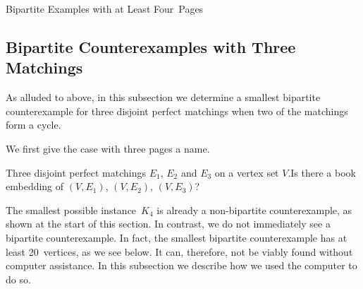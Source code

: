 \begin{subsection}{Bipartite Examples with at Least Four~Pages}
\begin{myproof}
%
%
%
%
%
\end{myproof}
%

\end{subsection}

\subsection{Bipartite Counterexamples with Three Matchings}\label{subsec:three}

As alluded to above, in this subsection we determine a smallest bipartite counterexample for
three disjoint perfect matchings when two of the matchings form a cycle. 

We first give the case with three pages a name.

\newProb{\probThreeMatching}
{Three disjoint perfect matchings $E_1$, $E_2$ and $E_3$ on a vertex
set $V$.}{Is there a book embedding of $(V, E_1)$, $(V, E_2)$, $(V, E_3)$?}

The smallest possible \probThreeMatching instance~$K_4$ is already a non-bipartite counterexample,
as shown at the start of this section. In contrast,
we do not immediately see a bipartite counterexample. In fact, the smallest bipartite counterexample
has at least 20~vertices, as we see below. It can, therefore, not be viably found without computer assistance.
In this subsection we describe how we used the computer to do so.

